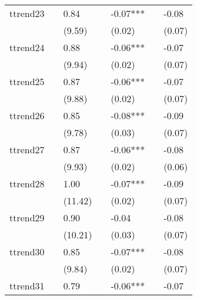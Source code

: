 \begin{table}
\begin{center}
\begin{tabular}{lllllll}
ttrend23                    &              & 0.84         &              & -0.07***     &              & -0.08         \\
                            &              & (9.59)       &              & (0.02)       &              & (0.07)        \\
ttrend24                    &              & 0.88         &              & -0.06***     &              & -0.07         \\
                            &              & (9.94)       &              & (0.02)       &              & (0.07)        \\
ttrend25                    &              & 0.87         &              & -0.06***     &              & -0.07         \\
                            &              & (9.88)       &              & (0.02)       &              & (0.07)        \\
ttrend26                    &              & 0.85         &              & -0.08***     &              & -0.09         \\
                            &              & (9.78)       &              & (0.03)       &              & (0.07)        \\
ttrend27                    &              & 0.87         &              & -0.06***     &              & -0.08         \\
                            &              & (9.93)       &              & (0.02)       &              & (0.06)        \\
ttrend28                    &              & 1.00         &              & -0.07***     &              & -0.09         \\
                            &              & (11.42)      &              & (0.02)       &              & (0.07)        \\
ttrend29                    &              & 0.90         &              & -0.04        &              & -0.08         \\
                            &              & (10.21)      &              & (0.03)       &              & (0.07)        \\
ttrend30                    &              & 0.85         &              & -0.07***     &              & -0.08         \\
                            &              & (9.84)       &              & (0.02)       &              & (0.07)        \\
ttrend31                    &              & 0.79         &              & -0.06***     &              & -0.07         \\

\end{tabular}
\end{center}
\end{table}
